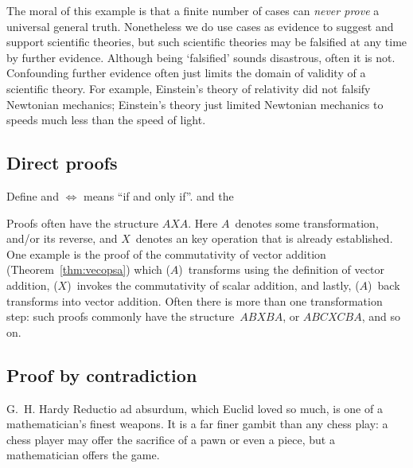 \begin{draft}

The moral of this example is that a finite number of cases can \emph{never prove} a universal general truth.
Nonetheless we do use cases as evidence to suggest and support scientific theories, but such scientific theories may be falsified at any time by further evidence.
Although being `falsified' sounds disastrous, often it is not.
Confounding further evidence often just limits the domain of validity of a scientific theory.
For example, Einstein's theory of relativity did not falsify Newtonian mechanics; Einstein's theory just limited Newtonian mechanics to speeds much less than the speed of light.










\subsection{Direct proofs}
\label{sec:dp}

Define  and \(\iff\) means ``if and only if''.
and the 

Proofs often have the structure \(AXA\).
Here \(A\)~denotes some transformation, and/or its reverse, and \(X\)~denotes an key operation that is already established.
One example is the proof of the commutativity of vector addition (Theorem~\ref{thm:vecopsa}) which (\(A\))~transforms using the definition of vector addition,  (\(X\))~invokes the commutativity of scalar addition, and lastly, (\(A\))~back transforms into vector addition.
Often there is more than one transformation step: such proofs commonly have the structure~\(ABXBA\), or \(ABCXCBA\), and so on.





\subsection{Proof by contradiction}
\label{sec:pc}

\begin{quoted}{G.~H. Hardy}
Reductio ad absurdum, which Euclid loved so much, is one of a mathematician's finest weapons.  
It is a far finer gambit than any chess play: a chess player may offer the sacrifice of a pawn or even a piece, but a mathematician offers the game.
\end{quoted}


\end{draft}
